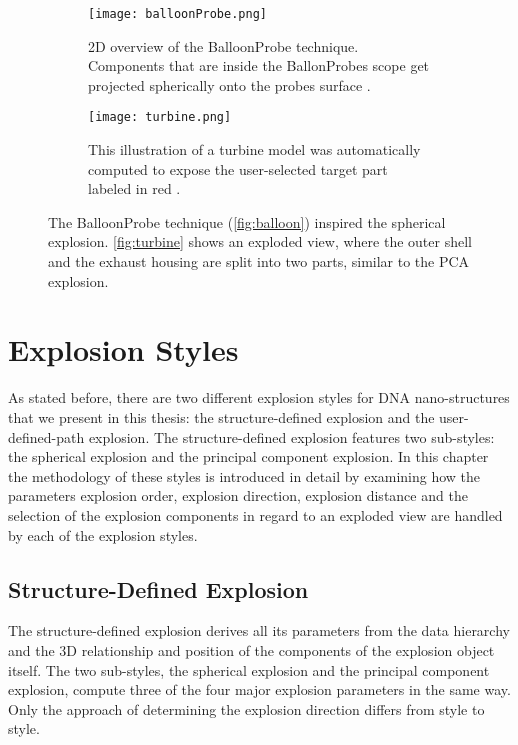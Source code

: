 \documentclass[draft,final]{vutinfth} %
\begin{document}
\begin{figure}
\centering
\begin{subfigure}{0.45\textwidth}
  \centering
  \texttt{[image: balloonProbe.png]}
  \caption{2D overview of the BalloonProbe technique. Components that are inside the BallonProbes scope get projected spherically onto the probes surface \cite{elmqvist2005balloonprobe}.}
  \label{fig:balloon}
\end{subfigure}%
\begin{subfigure}{0.5\textwidth}
  \centering
  \texttt{[image: turbine.png]}
  \caption{This illustration of a turbine model was automatically computed to expose the user-selected target part labeled in red \cite{li2008automated}.}
  \label{fig:turbine}
\end{subfigure}
\caption{The BalloonProbe technique (\autoref{fig:balloon}) inspired the spherical explosion. \autoref{fig:turbine} shows an exploded view, where the outer shell and the exhaust housing are split into two parts, similar to the PCA explosion.}
\label{fig:ballonAndTurbine}
\end{figure}


\chapter{Explosion Styles}
\label{chap:method}
As stated before, there are two different explosion styles for DNA nano-structures that we present in this thesis: the structure-defined explosion and the user-defined-path explosion. The structure-defined explosion features two sub-styles: the spherical explosion and the principal component explosion. In this chapter the methodology of these styles is introduced in detail by examining how the parameters explosion order, explosion direction, explosion distance and the selection of the explosion components in regard to an exploded view are handled by each of the explosion styles.

\section{Structure-Defined Explosion}
\label{sec:methodGuided}
The structure-defined explosion derives all its parameters from the data hierarchy and the 3D relationship and position of the components of the explosion object itself. The two sub-styles, the spherical explosion and the principal component explosion, compute three of the four major explosion parameters in the same way. 
Only the approach of determining the explosion direction differs from style to style.
\end{document}
